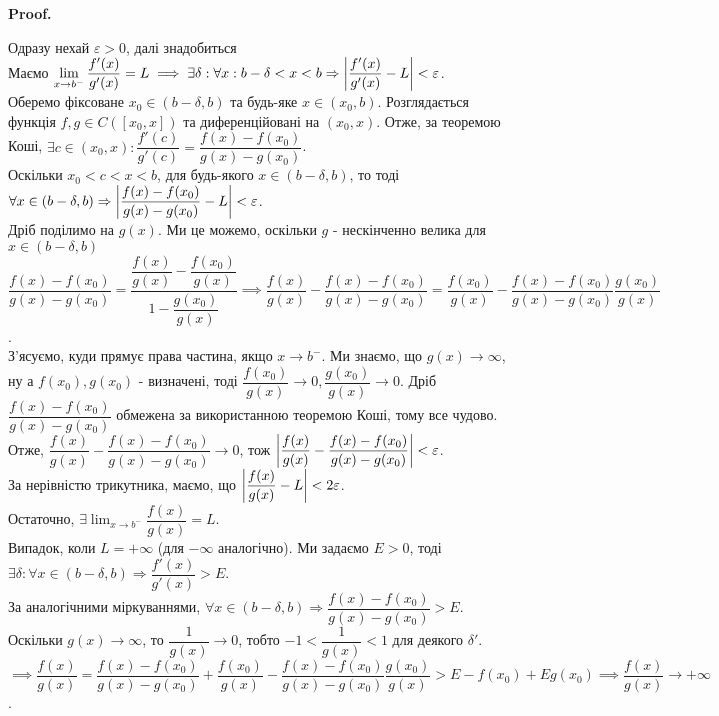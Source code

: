 \documentclass[a4paper, 14pt]{article}
\makeatletter
\def\huge{\displaystyle}
\def\qed{$\blacksquare$}
\theoremstyle{theoremdd}
\theoremstyle{theoremdd}
\theoremstyle{theoremdd}
\theoremstyle{theoremdd}
\theoremstyle{theoremdd}
\theoremstyle{theoremdd}
\theoremstyle{theoremdd}
\theoremstyle{theoremdd}
\renewenvironment{proof}[1][Proof.\\]{\par
\pushQED{\hfill \qed}%
\normalfont \topsep6\p@\@plus6\p@\relax
\trivlist
\item\relax
{\bfseries
#1\@addpunct{.}}\hspace\labelsep\ignorespaces
}{%
\popQED\endtrivlist\@endpefalse
}
\makeatother
\begin{document}
\begin{proof}
Одразу нехай $\varepsilon > 0$, далі знадобиться\\
Маємо $\huge\lim_{x \to b^-} \dfrac{f'(x)}{g'(x)} = L \implies \exists \delta: \forall x: b-\delta < x < b \Rightarrow \abs{\dfrac{f'(x)}{g'(x)}-L}<\varepsilon$.\\
Оберемо фіксоване $x_0 \in (b-\delta,b)$ та будь-яке $x \in (x_0,b)$. Розглядається функція $f,g \in C([x_0,x])$ та диференційовані на $(x_0,x)$. Отже, за теоремою Коші, $\exists c \in (x_0,x): \dfrac{f'(c)}{g'(c)} = \dfrac{f(x)-f(x_0)}{g(x)-g(x_0)}$.\\
Оскільки $x_0 < c < x < b$, для будь-якого $x \in (b-\delta,b)$, то тоді $\forall x \in (b-\delta,b) \Rightarrow \abs{\dfrac{f(x)-f(x_0)}{g(x)-g(x_0)} - L} < \varepsilon$.\\
Дріб поділимо на $g(x)$. Ми це можемо, оскільки $g$ - нескінченно велика для $x \in (b-\delta,b)$\\
$\dfrac{f(x)-f(x_0)}{g(x)-g(x_0)} = \dfrac{\dfrac{f(x)}{g(x)} - \dfrac{f(x_0)}{g(x)}}{1 - \dfrac{g(x_0)}{g(x)}} \implies \dfrac{f(x)}{g(x)} - \dfrac{f(x)-f(x_0)}{g(x)-g(x_0)} = \dfrac{f(x_0)}{g(x)} - \dfrac{f(x)-f(x_0)}{g(x)-g(x_0)} \dfrac{g(x_0)}{g(x)}$.\\
З'ясуємо, куди прямує права частина, якщо $x \to b^-$. Ми знаємо, що $g(x) \to \infty$, ну а $f(x_0),g(x_0)$ - визначені, тоді $\dfrac{f(x_0)}{g(x)} \to 0, \dfrac{g(x_0)}{g(x)} \to 0$. Дріб $\dfrac{f(x)-f(x_0)}{g(x)-g(x_0)}$ обмежена за використанною теоремою Коші, тому все чудово.\\
Отже, $\dfrac{f(x)}{g(x)} - \dfrac{f(x)-f(x_0)}{g(x)-g(x_0)} \to 0$, тож $\abs{\dfrac{f(x)}{g(x)} - \dfrac{f(x)-f(x_0)}{g(x)-g(x_0)}} < \varepsilon$.\\
За нерівністю трикутника, маємо, що $\abs{\dfrac{f(x)}{g(x)} - L} < 2\varepsilon$.\\
Остаточно, $\exists \huge\lim_{x \to b^-} \dfrac{f(x)}{g(x)} = L$.
\bigskip \\
Випадок, коли $L = +\infty$ (для $-\infty$ аналогічно). Ми задаємо $E > 0$, тоді $\exists \delta: \forall x \in (b-\delta,b) \Rightarrow \dfrac{f'(x)}{g'(x)} > E$.\\
За аналогічними міркуваннями, $\forall x \in (b-\delta,b) \Rightarrow \dfrac{f(x)-f(x_0)}{g(x)-g(x_0)} > E$.\\
Оскільки $g(x) \to \infty$, то $\dfrac{1}{g(x)} \to 0$, тобто $-1 < \dfrac{1}{g(x)} < 1$ для деякого $\delta'$.\\
$\implies \dfrac{f(x)}{g(x)} = \dfrac{f(x)-f(x_0)}{g(x)-g(x_0)} + \dfrac{f(x_0)}{g(x)} - \dfrac{f(x)-f(x_0)}{g(x)-g(x_0)} \dfrac{g(x_0)}{g(x)} > E - f(x_0) + Eg(x_0) \implies \dfrac{f(x)}{g(x)} \to +\infty$.
\end{proof}
\end{document}
